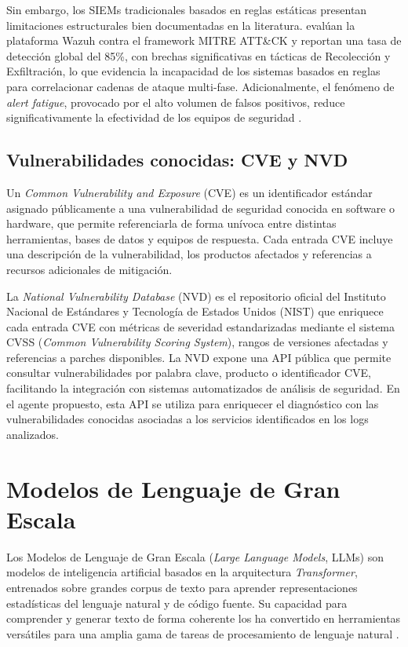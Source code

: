 Sin embargo, los SIEMs tradicionales basados en reglas estáticas presentan limitaciones estructurales bien documentadas en la literatura. \cite{oduola2025wazuh} evalúan la plataforma Wazuh contra el framework MITRE ATT\&CK y reportan una tasa de detección global del 85\%, con brechas significativas en tácticas de Recolección y Exfiltración, lo que evidencia la incapacidad de los sistemas basados en reglas para correlacionar cadenas de ataque multi-fase. Adicionalmente, el fenómeno de \textit{alert fatigue}, provocado por el alto volumen de falsos positivos, reduce significativamente la efectividad de los equipos de seguridad \cite{palma2025llm}.


\subsection{Vulnerabilidades conocidas: CVE y NVD}

Un \textit{Common Vulnerability and Exposure} (CVE) es un identificador
estándar asignado públicamente a una vulnerabilidad de seguridad conocida
en software o hardware, que permite referenciarla de forma unívoca entre
distintas herramientas, bases de datos y equipos de respuesta. Cada
entrada CVE incluye una descripción de la vulnerabilidad, los productos
afectados y referencias a recursos adicionales de mitigación.

La \textit{National Vulnerability Database} (NVD) es el repositorio
oficial del Instituto Nacional de Estándares y Tecnología de Estados
Unidos (NIST) que enriquece cada entrada CVE con métricas de severidad
estandarizadas mediante el sistema CVSS (\textit{Common Vulnerability
Scoring System}), rangos de versiones afectadas y referencias a parches
disponibles. La NVD expone una API pública que permite consultar
vulnerabilidades por palabra clave, producto o identificador CVE,
facilitando la integración con sistemas automatizados de análisis de
seguridad. En el agente propuesto, esta API se utiliza para enriquecer
el diagnóstico con las vulnerabilidades conocidas asociadas a los
servicios identificados en los logs analizados.

\section{Modelos de Lenguaje de Gran Escala}

Los Modelos de Lenguaje de Gran Escala (\textit{Large Language Models}, LLMs) son modelos de inteligencia artificial basados en la arquitectura \textit{Transformer}, entrenados sobre grandes corpus de texto para aprender representaciones estadísticas del lenguaje natural y de código fuente. Su capacidad para comprender y generar texto de forma coherente los ha convertido en herramientas versátiles para una amplia gama de tareas de procesamiento de lenguaje natural \cite{karlsen2023llm4sec}.

